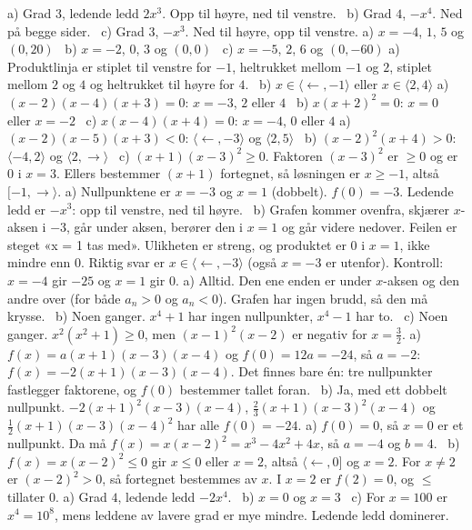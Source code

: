  a) Grad $3$, ledende ledd $2x^3$. Opp til høyre, ned til venstre. \ b) Grad $4$, $-x^4$. Ned på begge sider. \ c) Grad $3$, $-x^3$. Ned til høyre, opp til venstre.
 a) $x = -4$, $1$, $5$ og $(0, 20)$ \ b) $x = -2$, $0$, $3$ og $(0, 0)$ \ c) $x = -5$, $2$, $6$ og $(0, -60)$
 a) Produktlinja er stiplet til venstre for $-1$, heltrukket mellom $-1$ og $2$, stiplet mellom $2$ og $4$ og heltrukket til høyre for $4$. \ b) $x \in \langle \leftarrow, -1\rangle$ eller $x \in \langle 2, 4\rangle$
 a) $(x-2)(x-4)(x+3) = 0$: $x = -3$, $2$ eller $4$ \ b) $x(x+2)^2 = 0$: $x = 0$ eller $x = -2$ \ c) $x(x-4)(x+4) = 0$: $x = -4$, $0$ eller $4$
 a) $(x-2)(x-5)(x+3) < 0$: $\langle \leftarrow, -3\rangle$ og $\langle 2, 5\rangle$ \ b) $(x-2)^2(x+4) > 0$: $\langle -4, 2\rangle$ og $\langle 2, \to\rangle$ \ c) $(x+1)(x-3)^2 \ge 0$. Faktoren $(x-3)^2$ er $\ge 0$ og er $0$ i $x = 3$. Ellers bestemmer $(x+1)$ fortegnet, så løsningen er $x \ge -1$, altså $[-1, \to\rangle$.
 a) Nullpunktene er $x = -3$ og $x = 1$ (dobbelt). $f(0) = -3$. Ledende ledd er $-x^3$: opp til venstre, ned til høyre. \ b) Grafen kommer ovenfra, skjærer $x$-aksen i $-3$, går under aksen, berører den i $x = 1$ og går videre nedover.
 Feilen er steget «x = 1 tas med». Ulikheten er streng, og produktet er $0$ i $x = 1$, ikke mindre enn $0$. Riktig svar er $x \in \langle \leftarrow, -3\rangle$ (også $x = -3$ er utenfor). Kontroll: $x = -4$ gir $-25$ og $x = 1$ gir $0$.
 a) Alltid. Den ene enden er under $x$-aksen og den andre over (for både $a_n > 0$ og $a_n < 0$). Grafen har ingen brudd, så den må krysse. \ b) Noen ganger. $x^4 + 1$ har ingen nullpunkter, $x^4 - 1$ har to. \ c) Noen ganger. $x^2(x^2+1) \ge 0$, men $(x-1)^2(x-2)$ er negativ for $x = \frac{3}{2}$.
 a) $f(x) = a(x+1)(x-3)(x-4)$ og $f(0) = 12a = -24$, så $a = -2$: $f(x) = -2(x+1)(x-3)(x-4)$. Det finnes bare én: tre nullpunkter fastlegger faktorene, og $f(0)$ bestemmer tallet foran. \ b) Ja, med ett dobbelt nullpunkt. $-2(x+1)^2(x-3)(x-4)$, $\frac{2}{3}(x+1)(x-3)^2(x-4)$ og $\frac{1}{2}(x+1)(x-3)(x-4)^2$ har alle $f(0) = -24$.
 a) $f(0) = 0$, så $x = 0$ er et nullpunkt. Da må $f(x) = x(x-2)^2 = x^3 - 4x^2 + 4x$, så $a = -4$ og $b = 4$. \ b) $f(x) = x(x-2)^2 \le 0$ gir $x \le 0$ eller $x = 2$, altså $\langle \leftarrow, 0]$ og $x = 2$. For $x \neq 2$ er $(x-2)^2 > 0$, så fortegnet bestemmes av $x$. I $x = 2$ er $f(2) = 0$, og $\le$ tillater $0$.
 a) Grad $4$, ledende ledd $-2x^4$. \ b) $x = 0$ og $x = 3$ \ c) For $x = 100$ er $x^4 = 10^8$, mens leddene av lavere grad er mye mindre. Ledende ledd dominerer.

